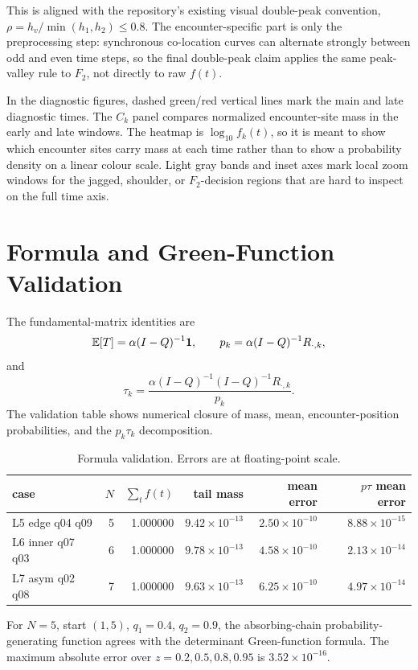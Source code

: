 \documentclass[10pt]{article}
\begin{document}
This is aligned with the repository's existing visual double-peak convention,
\(\rho=h_v/\min(h_1,h_2)\leq 0.8\).  The encounter-specific part is only the
preprocessing step: synchronous co-location curves can alternate strongly
between odd and even time steps, so the final double-peak claim applies the
same peak-valley rule to \(F_2\), not directly to raw \(f(t)\).

In the diagnostic figures, dashed green/red vertical lines mark the main and
late diagnostic times.  The \(C_k\) panel compares normalized encounter-site
mass in the early and late windows.  The heatmap is \(\log_{10} f_k(t)\), so it
is meant to show which encounter sites carry mass at each time rather than to
show a probability density on a linear colour scale.  Light gray bands and
inset axes mark local zoom windows for the jagged, shoulder, or \(F_2\)-decision
regions that are hard to inspect on the full time axis.

\section*{Formula and Green-Function Validation}
The fundamental-matrix identities are
\[
\mathbb{E}[T]=\alpha (I-Q)^{-1}{\bf 1},\qquad
p_k=\alpha (I-Q)^{-1}R_{\cdot,k},
\]
and
\[
\tau_k
=\frac{\alpha (I-Q)^{-1}(I-Q)^{-1}R_{\cdot,k}}{p_k}.
\]
The validation table shows numerical closure of mass, mean, encounter-position
probabilities, and the \(p_k\tau_k\) decomposition.

\begin{table}[!htbp]
\centering
\footnotesize
\caption{Formula validation.  Errors are at floating-point scale.}
\begin{tabular}{L{2.8cm}rrrrr}
\toprule
case & \(N\) & \(\sum_t f(t)\) & tail mass & mean error & \(p\tau\) mean error\\
\midrule
L5 edge q04 q09 & 5 & 1.000000 & \(9.42{\times}10^{-13}\) & \(2.50{\times}10^{-10}\) & \(8.88{\times}10^{-15}\)\\
L6 inner q07 q03 & 6 & 1.000000 & \(9.78{\times}10^{-13}\) & \(4.58{\times}10^{-10}\) & \(2.13{\times}10^{-14}\)\\
L7 asym q02 q08 & 7 & 1.000000 & \(9.63{\times}10^{-13}\) & \(6.25{\times}10^{-10}\) & \(4.97{\times}10^{-14}\)\\
\bottomrule
\end{tabular}
\end{table}

For \(N=5\), start \((1,5)\), \(q_1=0.4\), \(q_2=0.9\), the absorbing-chain
probability-generating function agrees with the determinant Green-function
formula.  The maximum absolute error over \(z=0.2,0.5,0.8,0.95\) is
\(3.52\times 10^{-16}\).
\end{document}
